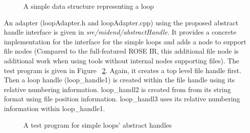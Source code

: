 \begin{figure}[!h]
{\indent
{\mySmallestFontSize
\begin{latexonly}
  
\end{latexonly}

\begin{htmlonly}
   
\end{htmlonly}

}
}
\caption{A simple data structure representing a loop}
\label{Tutorial:myloop}
\end{figure}


An adapter (loopAdapter.h and loopAdapter.cpp) using the proposed abstract
handle interface is given in \textit{src/midend/abstractHandle}.
It provides a concrete implementation for the interface for the simple loops and adds a
node to support file nodes (Compared to the full-featured ROSE IR, this
additional file node is additional work when using tools without internal nodes
supporting files). 
The test program is given in Figure ~\ref{Tutorial:testMyLoop}.
Again, it creates a top level file handle first. Then a loop handle
(loop\_handle1) is
created within the file handle using its relative numbering information. 
loop\_handl2 is created from from its string format using file position
information. loop\_handl3 uses its relative numbering information within
loop\_handle1. 
\begin{figure}[!h]
{\indent
{\mySmallestFontSize
\begin{latexonly}
  
\end{latexonly}

\begin{htmlonly}
   
\end{htmlonly}

}
}
\caption{A test program for simple loops' abstract handles}
\label{Tutorial:testMyLoop}
\end{figure}


